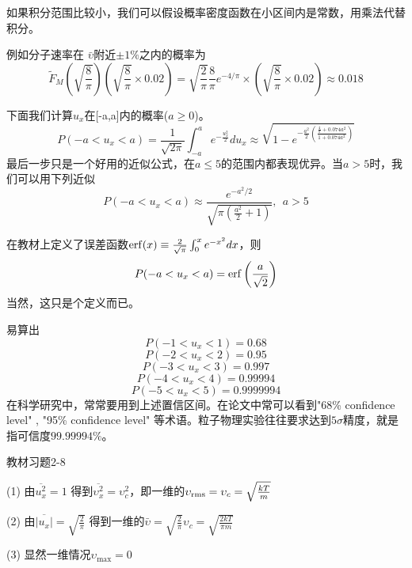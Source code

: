 \documentclass[CJK]{beamer}
\begin{document}
\begin{frame}
\bch
{\scriptsize
如果积分范围比较小，我们可以假设概率密度函数在小区间内是常数，用乘法代替积分。

\skipline

例如分子速率在 $\bar{\upsilon}$附近$\pm 1\%$之内的概率为
$$ \tilde{F}_M(\sqrt{\frac{8}{\pi}}) (\sqrt{\frac{8}{\pi}} \times 0.02) =\sqrt{\frac{2}{\pi}} \frac{8}{\pi}e^{-4/\pi} \times\left(\sqrt{\frac{8}{\pi}}\times 0.02 \right) \approx 0.018  $$
}
\ech
\end{frame}


\begin{frame}
\bch
{\scriptsize
下面我们计算$u_x$在[-a,a]内的概率($a\ge 0$)。
$$P(-a<u_x<a) = \frac{1}{\sqrt{2\pi}} \int_{-a}^a e^{-\frac{u_x^2}{2}}du_x \approx  \sqrt{1-e^{-\frac{a^2}{2}\left(\frac{\frac{4}{\pi}+ 0.074a^2}{1+0.074a^2}\right)}}$$
最后一步只是一个好用的近似公式，在$a \le 5 $的范围内都表现优异。当$a > 5$时，我们可以用下列近似
$$P(-a<u_x<a) \approx \frac{e^{-a^2/2}}{\sqrt{\pi(\frac{a^2}{2}+1)}}, \ \ a>5 $$

在教材上定义了误差函数$\mathrm{erf}(x) \equiv \frac{2}{\sqrt{\pi}}\int_0^x e^{-x^2}dx $，则
$$P(-a<u_x<a) = \mathrm{erf}\left(\frac{a}{ \sqrt{2}}\right)$$
当然，这只是个定义而已。
}
\ech
\end{frame}

\begin{frame}
\bch
{\scriptsize
易算出
$$P(-1<u_x<1) =  0.68$$
$$P(-2<u_x<2) = 0.95$$
$$P(-3<u_x<3) = 0.997$$
$$P(-4<u_x<4) = 0.99994$$
$$P(-5<u_x<5) = 0.9999994$$
在科学研究中，常常要用到上述置信区间。在论文中常可以看到"68\% confidence level" , "95\% confidence level" 等术语。粒子物理实验往往要求达到$5\sigma$精度，就是指可信度$99.99994\%$。
}
\ech
\end{frame}


\begin{frame}
\bch
{\blue 教材习题2-8}

{\scriptsize
\bitem
\item[(1)]{由$\overline{u_x^2} = 1$ 得到$\overline{\upsilon_x^2} = \upsilon_c^2$，即一维的$\upsilon_{\rm rms} = \upsilon_c = \sqrt{\frac{kT}{m}}$}
\item[(2)]{由$\overline{|u_x|} = \sqrt{\frac{2}{\pi}}$  得到一维的$\bar{\upsilon} =  \sqrt{\frac{2}{\pi}}\upsilon_c = \sqrt{\frac{2kT}{\pi m}}$}
\item[(3)]{显然一维情况$\upsilon_{\max} = 0$}
\eitem

}
\ech
\end{frame}
\end{document}
